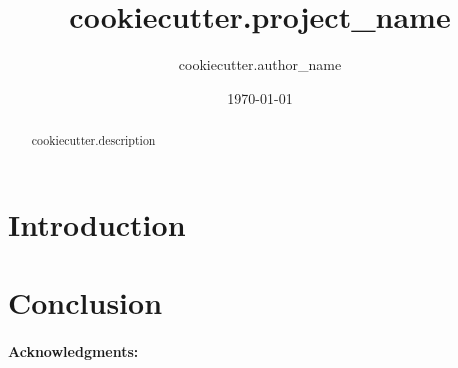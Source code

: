 \documentclass[11pt,a4paper]{article}
\begin{document}
\title{ {{ cookiecutter.project_name }} }

\author{ {{ cookiecutter.author_name }} }
\date{\today}
\maketitle

\begin{abstract}
 {{ cookiecutter.description }}
\end{abstract}

\section{Introduction}


\section{Conclusion}

\newpage 

\paragraph*{Acknowledgments:}



\end{document}
